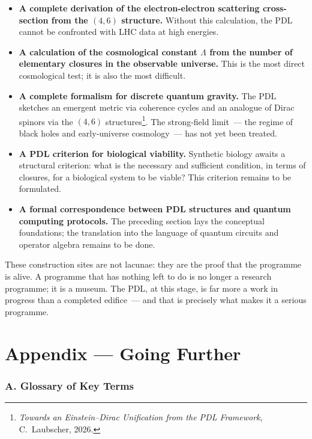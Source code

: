\documentclass[12pt, a4paper, openright]{book}
\begin{document}
\begin{itemize}
\item \textbf{A complete derivation of the electron-electron scattering cross-section from the $(4,6)$ structure.} Without this calculation, the PDL cannot be confronted with LHC data at high energies.
\item \textbf{A calculation of the cosmological constant $\Lambda$ from the number of elementary closures in the observable universe.} This is the most direct cosmological test; it is also the most difficult.
\item \textbf{A complete formalism for discrete quantum gravity.} The PDL sketches an emergent metric via coherence cycles and an analogue of Dirac spinors via the $(4,6)$ structures\footnote{\textit{Towards an Einstein--Dirac Unification from the PDL Framework}, C.~Laubscher, 2026.}. The strong-field limit~--- the regime of black holes and early-universe cosmology~--- has not yet been treated.
\item \textbf{A PDL criterion for biological viability.} Synthetic biology awaits a structural criterion: what is the necessary and sufficient condition, in terms of closures, for a biological system to be viable? This criterion remains to be formulated.
\item \textbf{A formal correspondence between PDL structures and quantum computing protocols.} The preceding section lays the conceptual foundations; the translation into the language of quantum circuits and operator algebra remains to be done.
\end{itemize}

\medskip

These construction sites are not lacunae: they are the proof that the programme is alive. A programme that has nothing left to do is no longer a research programme; it is a museum. The PDL, at this stage, is far more a work in progress than a completed edifice~--- and that is precisely what makes it a serious programme.

\backmatter
\appendix

\chapter*{Appendix — Going Further}

\subsection*{A. Glossary of Key Terms}
\end{document}
